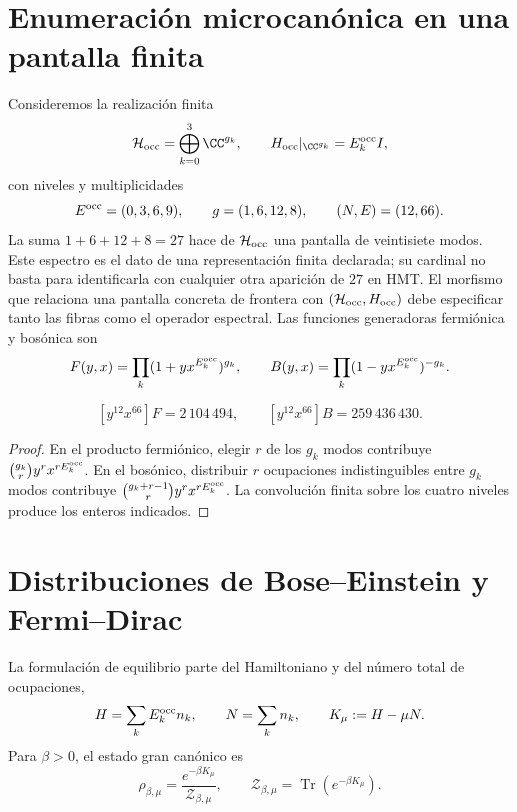 \section{Enumeración microcanónica en una pantalla finita}

Consideremos la realización finita
\[
 \mathcal H_{\rm occ}=\bigoplus_{k=0}^{3}\CC^{g_k},
 \qquad
 H_{\rm occ}|_{\CC^{g_k}}=E_k^{\rm occ} I,
\]
con niveles y multiplicidades
\[
 E^{\rm occ}=(0,3,6,9),\qquad g=(1,6,12,8),
 \qquad(N,E)=(12,66).
\]
La suma \(1+6+12+8=27\) hace de \(\mathcal H_{\rm occ}\) una pantalla de
veintisiete modos. Este espectro es el dato de una representación finita
declarada; su cardinal no basta para identificarla con cualquier otra
aparición de \(27\) en HMT\@. El morfismo que relaciona una pantalla concreta
de frontera con \((\mathcal H_{\rm occ},H_{\rm occ})\) debe especificar tanto
las fibras como el operador espectral.
Las funciones generadoras fermiónica y bosónica son
\[
 F(y,x)=\prod_k(1+yx^{E_k^{\rm occ}})^{g_k},
 \qquad
 B(y,x)=\prod_k(1-yx^{E_k^{\rm occ}})^{-g_k}.
\]

\begin{proposition}
\label{prop:cardinalidades-microcanonicas}
\[
 [y^{12}x^{66}]F=2\,104\,494,
 \qquad
 [y^{12}x^{66}]B=259\,436\,430.
\]
\end{proposition}
\begin{proof}
En el producto fermiónico, elegir \(r\) de los \(g_k\) modos contribuye
\(\binom{g_k}{r}y^rx^{rE_k^{\rm occ}}\). En el bosónico, distribuir \(r\)
ocupaciones indistinguibles entre \(g_k\) modos contribuye
\(\binom{g_k+r-1}{r}y^rx^{rE_k^{\rm occ}}\). La convolución finita sobre los
cuatro niveles produce los enteros indicados.
\end{proof}

\section{Distribuciones de Bose--Einstein y Fermi--Dirac}

La formulación de equilibrio parte del Hamiltoniano y del número total de
ocupaciones,
\begin{equation}
 H=\sum_kE_k^{\rm occ} n_k,
 \qquad
 N=\sum_k n_k,
 \qquad
 K_\mu:=H-\mu N.
 \label{eq:hamiltoniano-gran-canonico-rev3}
\end{equation}
Para \(\beta>0\), el estado gran canónico es
\begin{equation}
 \rho_{\beta,\mu}
 =\frac{e^{-\beta K_\mu}}{\mathcal Z_{\beta,\mu}},
 \qquad
 \mathcal Z_{\beta,\mu}
 =\operatorname{Tr}(e^{-\beta K_\mu}).
 \label{eq:estado-gran-canonico-rev3}
\end{equation}

